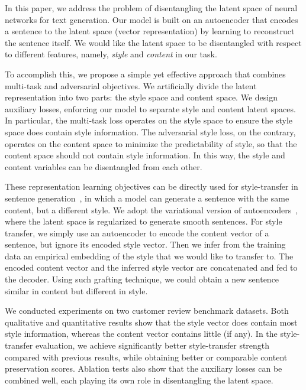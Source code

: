 \documentclass[letterpaper]{article} %
\begin{document}
In this paper, we address the problem of disentangling the latent space of neural networks for text generation. Our model is built on an autoencoder that encodes a sentence to the latent space (vector representation) by learning to reconstruct the sentence itself. We would like the latent space to be disentangled with respect to different features, namely, \textit{style} and \textit{content} in our task.

To accomplish this, we propose a simple yet effective approach that combines multi-task and adversarial objectives. We artificially divide the latent representation into two parts: the style space and content space. We design auxiliary losses, enforcing our model to separate style and content latent spaces. In particular, the multi-task loss operates on the style space to ensure the style space does contain style information. The adversarial style loss, on the contrary, operates on the content space to minimize the predictability of style, so that the content space should not contain style information. In this way, the style and content variables can be disentangled from each other.

These representation learning objectives can be directly used for style-transfer in sentence generation~\cite{hu2017toward,shen2017style,fu2017style}, in which a model can generate a sentence with the same content, but a different style.  We adopt the variational version of autoencoders~\cite{kingma2013auto}, where the latent space is regularized to generate smooth sentences.
For style transfer, we simply use an autoencoder to encode the content vector of a sentence, but ignore its encoded style vector. Then we infer from the training data an empirical embedding of the style that we would like to transfer to. The encoded content vector and the inferred style vector are concatenated and fed to the decoder. Using such grafting technique, we could obtain a new sentence similar in content but different in style.

We conducted experiments on two customer review benchmark datasets. Both qualitative and quantitative results show that the style vector does contain most style information, whereas the content vector contains little (if any). In the style-transfer evaluation, we achieve significantly better style-transfer strength compared with previous results, while obtaining better or comparable content preservation scores.  Ablation tests also show that the auxiliary losses can be combined well, each playing its own role in disentangling the latent space.
\end{document}
